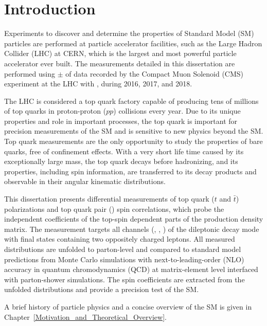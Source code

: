 
\chapter{Introduction}
\label{Introduction}
Experiments to discover and determine the properties of Standard Model (SM) particles are performed at particle accelerator facilities, such as the Large Hadron Collider (LHC) at CERN, which is the largest and most powerful particle accelerator ever built.
The measurements detailed in this dissertation are performed using \lumivalueRuniiUL $\pm$ \lumierrRuniiUL of data recorded by the Compact Muon Solenoid (CMS) experiment at the LHC with \beamenergy, during 2016, 2017, and 2018.

The LHC is considered a top quark factory capable of producing tens of millions of top quarks in proton-proton ($pp$) collisions every year.
Due to its unique properties and role in important processes, the top quark is important for precision measurements of the SM and is sensitive to new physics beyond the SM.
Top quark measurements are the only opportunity to study the properties of bare quarks, free of confinement effects.
With a very short life time caused by its exceptionally large mass, the top quark decays before hadronizing, and its properties, including spin information, are transferred to its decay products and observable in their angular kinematic distributions.

This dissertation presents differential measurements of top quark ($t$ and $\bar{t}$) polarizations and top quark pair (\ttbar) spin correlations, which probe the independent coefficients of the top-spin dependent parts of the \ttbar production density matrix.
The measurement targets all channels (\ee, \emu, \mumu) of the \ttbar dileptonic decay mode with final states containing two oppositely charged leptons.
All measured distributions are unfolded to parton-level and compared to standard model predictions from Monte Carlo simulations with next-to-leading-order (NLO) accuracy in quantum chromodynamics (QCD) at 
matrix-element level interfaced with parton-shower simulations.
The spin coefficients are extracted from the unfolded distributions and provide a precision test of the SM.

A brief history of particle physics and a concise overview of the SM is given in Chapter~\ref{Motivation_and_Theoretical_Overview}.




